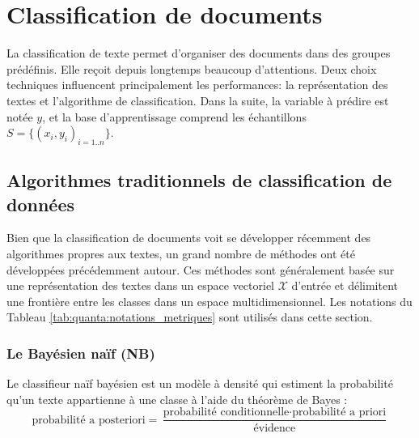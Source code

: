 \section{Classification de documents}
\label{sec:sensresultat:biblio_classif}

La classification de texte permet d'organiser des documents dans des groupes prédéfinis. Elle reçoit depuis longtemps beaucoup d'attentions. Deux choix techniques influencent principalement les performances: la représentation des textes et l'algorithme de classification. Dans la suite, la variable à prédire est notée $y$, et la base d'apprentissage comprend les échantillons $S = \lbrace (x_i, y_i)_{i=1..n} \rbrace$.

\subsection{Algorithmes traditionnels de classification de données}
Bien que la classification de documents voit se développer récemment des algorithmes propres aux textes, un grand nombre de méthodes ont été développées précédemment autour. Ces méthodes sont généralement basée sur une représentation  des textes dans un espace vectoriel $\mathcal{X}$ d'entrée et délimitent une frontière entre les classes dans un espace multidimensionnel. Les notations du Tableau \ref{tab:quanta:notations_metriques} sont utilisés dans cette section. 

\subsubsection{Le Bayésien naïf (NB)}
Le classifieur naïf bayésien \citep{duda1973patternclass} est  un modèle à densité qui estiment la probabilité qu'un texte appartienne à une classe à l'aide du théorème de Bayes \citep{raschka2014naivebayes}:
\begin{equation}
\text{probabilité a posteriori} = \frac{\text{probabilité conditionnelle} \cdot \text{probabilité a priori}}{\text{évidence}}
\end{equation}

